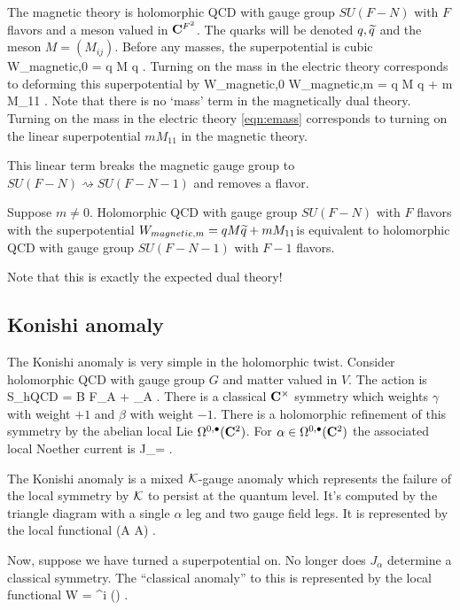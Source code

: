 \documentclass[11pt]{amsart}
\renewcommand{\op}{\operatorname}
\begin{document}
The magnetic theory is holomorphic QCD with gauge group $SU(F-N)$ with $F$ flavors and a meson valued in $\mathbf{C}^{F^2}$.
The quarks will be denoted $q, \widetilde q$ and the meson $M = (M_{ij})$.
Before any masses, the superpotential is cubic
\beqn
W_{magnetic,0} = q M \til q .
\eeqn
Turning on the mass in the electric theory corresponds to deforming this superpotential by
\beqn
W_{magnetic,0} \rightsquigarrow W_{magnetic,m} = q M \til q + m M_{11} .
\eeqn
Note that there is no `mass' term in the magnetically dual theory.
Turning on the mass in the electric theory \eqref{eqn:emass} corresponds to turning on the linear superpotential $m M_{11}$ in the magnetic theory.

This linear term breaks the magnetic gauge group to $SU(F-N) \rightsquigarrow SU(F-N-1)$ and removes a flavor.

\begin{prop}
Suppose $m \ne 0$.
Holomorphic QCD with gauge group $SU(F-N)$ with $F$ flavors with the superpotential $W_{magnetic,m} = q M \widetilde q + m M_{11}$is equivalent to holomorphic QCD with gauge group $SU(F-N-1)$ with $F-1$ flavors.
\end{prop}

Note that this is exactly the expected dual theory!


\subsection{Konishi anomaly}

The Konishi anomaly is very simple in the holomorphic twist.
Consider holomorphic QCD with gauge group $G$ and matter valued in $V$.
The action is
\beqn
S_{hQCD} = \int B F_A + \int \beta \dbar_A \gamma .
\eeqn
There is a classical $\mathbf{C}^\times$ symmetry which weights $\gamma$ with weight $+1$ and $\beta$ with weight $-1$.
There is a holomorphic refinement of this symmetry by the abelian local Lie
$\Omega^{0,\bullet}(\mathbf{C}^2)$.
For $\alpha \in \Omega^{0,\bullet}(\mathbf{C}^2)$ the associated local Noether current is
\beqn
J_\alpha = \int \beta \alpha \gamma .
\eeqn

The Konishi anomaly is a mixed $\mathcal K$-gauge anomaly which represents the failure of the local symmetry by $\mathcal K$ to persist at the quantum level.
It's computed by the triangle diagram with a single $\alpha$ leg and two gauge field legs.
It is represented by the local functional
\beqn
\int \alpha \op{tr}(\del A \del A) .
\eeqn

Now, suppose we have turned a superpotential on.
No longer does $J_{\alpha}$ determine a classical symmetry.
The ``classical anomaly'' to this is represented by the local functional
\beqn
\int \alpha \gamma \del W = \int \alpha \gamma^i  (\gamma) .
\eeqn
\end{document}
